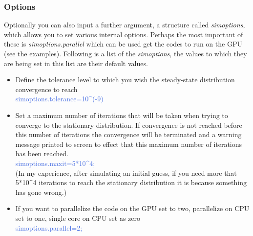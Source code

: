 \subsubsection{Options}
Optionally you can also input a further argument, a structure called \textit{simoptions}, which allows you to set various internal options. Perhaps
the most important of these is \textit{simoptions.parallel} which can be used get the codes to run on the GPU (see the examples).
Following is a list of the \textit{simoptions}, the values to which they are being set in this list are their default values.
 \begin{itemize}
 \item Define the tolerance level to which you wish the steady-state distribution convergence to reach \\
    \textcolor{RoyalBlue}{simoptions.tolerance=10\^{}(-9)}
 \item Set a maximum number of iterations that will be taken when trying to converge to the stationary distribution. If convergence is not reached before this number of iterations the convergence will be terminated and a warning message printed to screen to effect that this maximum number of iterations has been reached. \\
    \textcolor{RoyalBlue}{simoptions.maxit=5*10\^{}4;} \\
      (In my experience, after simulating an initial guess, if you need more that 5*10\^{}4 iterations to reach the stationary distribution it is because something has gone wrong.)
  \item If you want to parallelize the code on the GPU set to two, parallelize on CPU set to one, single core on CPU set as zero \\
    \textcolor{RoyalBlue}{simoptions.parallel=2;}
\end{itemize}
